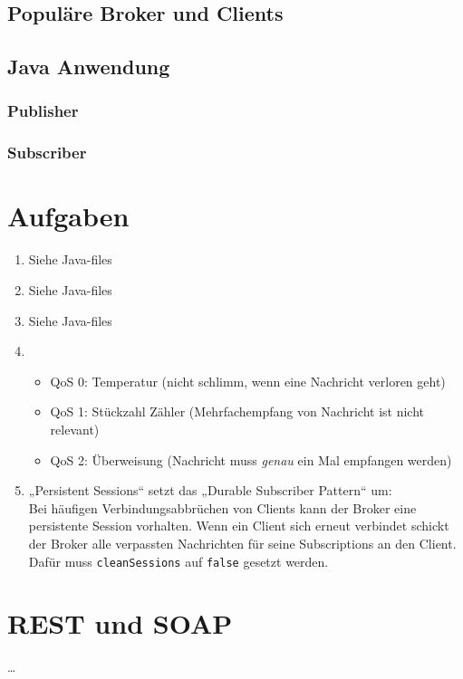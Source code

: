 \subsection{Populäre Broker und Clients}

\subsection{Java Anwendung}
\subsubsection{Publisher}
\subsubsection{Subscriber}

\section{Aufgaben}
\begin{enumerate}
\item Siehe Java-files
\item Siehe Java-files
\item Siehe Java-files
\item \begin{itemize}
\item QoS 0: Temperatur (nicht schlimm, wenn eine Nachricht verloren geht)
\item QoS 1: Stückzahl Zähler (Mehrfachempfang von Nachricht ist nicht relevant)
\item QoS 2: Überweisung (Nachricht muss \emph{genau} ein Mal empfangen werden)
\end{itemize}
\item „Persistent Sessions“ setzt das „Durable Subscriber Pattern“ um:\\
Bei häufigen Verbindungsabbrüchen von Clients kann der Broker eine persistente Session vorhalten. Wenn ein Client sich erneut verbindet schickt der Broker alle verpassten Nachrichten für seine Subscriptions an den Client.\\
Dafür muss \lstinline$cleanSessions$ auf \lstinline$false$ gesetzt werden.
\end{enumerate}

\section{REST und SOAP}
…








